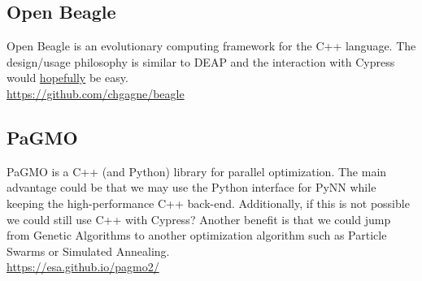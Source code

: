 \documentclass[11pt,a4paper]{article}
\begin{document}
\subsection{Open Beagle}
Open Beagle is an evolutionary computing framework for the C++ language. 
The design/usage philosophy is similar to DEAP and the interaction with Cypress would \underline{hopefully} be easy.\\

\url{https://github.com/chgagne/beagle}


\subsection{PaGMO}
PaGMO is a C++ (and Python) library for parallel optimization. 
The main advantage could be that we may use the Python interface for PyNN while keeping the high-performance C++ back-end.
Additionally, if this is not possible we could still use C++ with Cypress?
Another benefit is that we could jump from Genetic Algorithms to another optimization algorithm such as Particle Swarms or Simulated Annealing.\\

\url{https://esa.github.io/pagmo2/}
\end{document}
